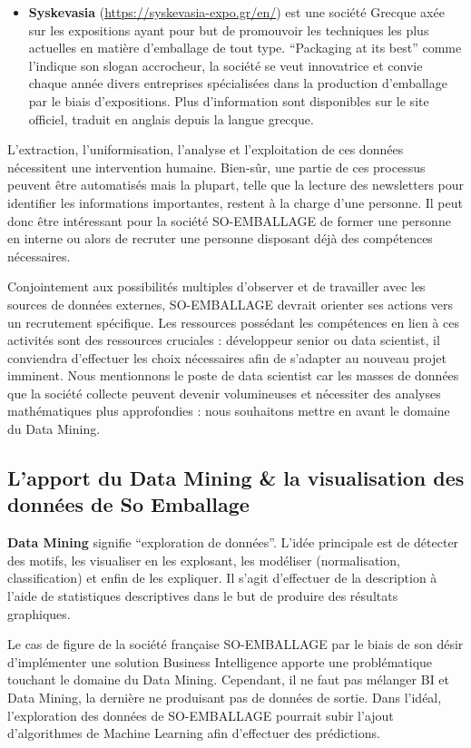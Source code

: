 \begin{itemize}[label=\textbullet, font=\LARGE \color{listGreen}]
	\item \textbf{Syskevasia} (\url{https://syskevasia-expo.gr/en/}) est une société Grecque axée sur les expositions ayant pour but de promouvoir les techniques les plus actuelles en matière d’emballage de tout type. “Packaging at its best” comme l’indique son slogan accrocheur, la société se veut innovatrice et convie chaque année divers entreprises spécialisées dans la production d’emballage par le biais d’expositions. Plus d’information sont disponibles sur le site officiel, traduit en anglais depuis la langue grecque.  
\end{itemize}

L’extraction, l’uniformisation, l’analyse et l’exploitation de ces données nécessitent une intervention humaine. Bien-sûr, une partie de ces processus peuvent être automatisés mais la plupart, telle que la lecture des newsletters pour identifier les informations importantes, restent à la charge d’une personne. Il peut donc être intéressant pour la société SO-EMBALLAGE de former une personne en interne ou alors de recruter une personne disposant déjà des compétences nécessaires.   \vertspace

Conjointement aux possibilités multiples d’observer et de travailler avec les sources de données externes, SO-EMBALLAGE devrait orienter ses actions vers un recrutement spécifique. Les ressources possédant les compétences en lien à ces activités sont des ressources cruciales : développeur senior ou data scientist, il conviendra d’effectuer les choix nécessaires afin de s’adapter au nouveau projet imminent. Nous mentionnons le poste de data scientist car les masses de données que la société collecte peuvent devenir volumineuses et nécessiter des analyses mathématiques plus approfondies : nous souhaitons mettre en avant le domaine du Data Mining. 

\subsection{L’apport du Data Mining \& la visualisation des données de So Emballage}   

\textbf{Data Mining} signifie “exploration de données”. L’idée principale est de détecter des motifs, les visualiser en les explosant, les modéliser (normalisation, classification) et enfin de les expliquer. Il s’agit d’effectuer de la description à l’aide de statistiques descriptives dans le but de produire des résultats graphiques.  

Le cas de figure de la société française SO-EMBALLAGE par le biais de son désir d’implémenter une solution Business Intelligence apporte une problématique touchant le domaine du Data Mining.  Cependant, il ne faut pas mélanger BI et Data Mining, la dernière ne produisant pas de données de sortie.  Dans l’idéal, l’exploration des données de SO-EMBALLAGE pourrait subir l’ajout d’algorithmes de Machine Learning afin d’effectuer des prédictions.   

